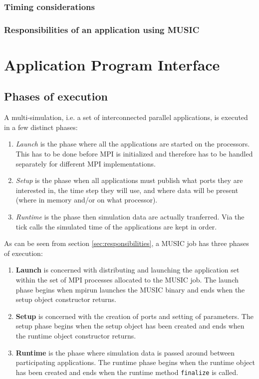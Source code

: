 \documentclass[a4paper]{report}
\begin{document}
\subsection{Timing considerations}

\subsection{Responsibilities of an application using MUSIC}

\chapter{Application Program Interface}

\section{Phases of execution}

A multi-simulation, i.e. a set of interconnected parallel
applications, is executed in a few distinct phases:
\begin{enumerate}
\item \emph{Launch} is the phase where all the applications are
  started on the processors.  This has to be done before MPI is
  initialized and therefore has to be handled separately for different
  MPI implementations.
\item \emph{Setup} is the phase when all applications must publish
  what ports they are interested in, the time step they will use, and
  where data will be present (where in memory and/or on what processor).
\item \emph{Runtime} is the phase then simulation data are actually
  tranferred.  Via the tick calls the simulated time of the
  applications are kept in order.
\end{enumerate}

As can be seen from section \ref{sec:responsibilities}, a MUSIC job
has three phases of execution:
\begin{enumerate}
  \item \textbf{Launch} is concerned with distributing and launching
    the application set within the set of MPI processes allocated to
    the MUSIC job.  The launch phase begins when mpirun launches the
    MUSIC binary and ends when the setup object constructor returns.
  \item \textbf{Setup} is concerned with the creation of ports and
    setting of parameters.  The setup phase begins when the setup
    object has been created and ends when the runtime object
    constructor returns.
  \item \textbf{Runtime} is the phase where simulation data is passed
    around between participating applications.  The runtime phase
    begins when the runtime object has been created and ends when the
    runtime method \verb|finalize| is called.
\end{enumerate}
\end{document}
